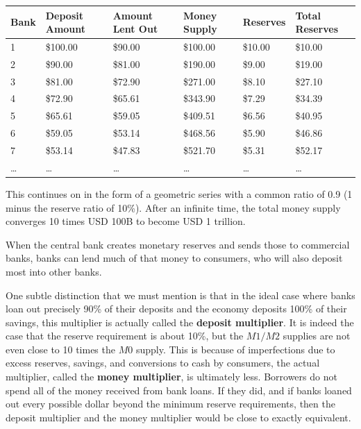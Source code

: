 \documentclass{article}
\begin{document}
\begin{example}
      \begin{tabular}{|l|l|l|l|l|l|}
        \hline
        Bank & Deposit Amount & Amount Lent Out & Money Supply & Reserves & Total Reserves \\
        \hline
        1 & \$100.00 & \$90.00 & \$100.00 & \$10.00 & \$10.00 \\
        2 & \$90.00 & \$81.00 & \$190.00 & \$9.00 & \$19.00 \\
        3 & \$81.00 & \$72.90 & \$271.00 & \$8.10 & \$27.10 \\
        4 & \$72.90 & \$65.61 & \$343.90 & \$7.29 & \$34.39 \\
        5 & \$65.61 & \$59.05 & \$409.51 & \$6.56 & \$40.95 \\
        6 & \$59.05 & \$53.14 & \$468.56 & \$5.90 & \$46.86 \\
        7 & \$53.14 & \$47.83 & \$521.70 & \$5.31 & \$52.17 \\
        \ldots & \ldots & \ldots & \ldots & \ldots & \ldots \\
        \hline
      \end{tabular}

      This continues on in the form of a geometric series with a common ratio of 0.9 (1 minus the reserve ratio of 10\%). After an infinite time, the total money supply converges 10 times USD 100B to become USD 1 trillion.
    \end{example}

    \begin{definition}
      \label{def:money-multiplier-effect}
      When the central bank creates monetary reserves and sends those to commercial banks, banks can lend much of that money to consumers, who will also deposit most into other banks. 
    \end{definition}

    One subtle distinction that we must mention is that in the ideal case where banks loan out precisely 90\% of their deposits and the economy deposits 100\% of their savings, this multiplier is actually called the \textbf{deposit multiplier}. It is indeed the case that the reserve requirement is about 10\%, but the $M1/M2$ supplies are not even close to 10 times the $M0$ supply. This is because of imperfections due to excess reserves, savings, and conversions to cash by consumers, the actual multiplier, called the \textbf{money multiplier}, is ultimately less. Borrowers do not spend all of the money received from bank loans. If they did, and if banks loaned out every possible dollar beyond the minimum reserve requirements, then the deposit multiplier and the money multiplier would be close to exactly equivalent.
\end{document}
